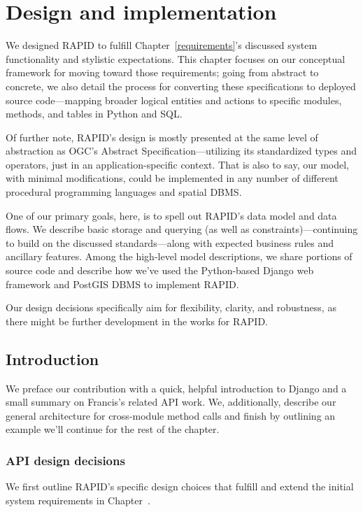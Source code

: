 \chapter{Design and implementation}
\label{design}

We designed RAPID to fulfill Chapter~\ref{requirements}'s discussed system functionality and stylistic expectations. This chapter focuses on our conceptual framework for moving toward those requirements; going from abstract to concrete, we also detail the process for converting these specifications to deployed source code---mapping broader logical entities and actions to specific modules, methods, and tables in Python and SQL.

Of further note, RAPID's design is mostly presented at the same level of abstraction as OGC's Abstract Specification---utilizing its standardized types and operators, just in an application-specific context. That is also to say, our model, with minimal modifications, could be implemented in any number of different procedural programming languages and spatial DBMS.

One of our primary goals, here, is to spell out RAPID's data model and data flows. We describe basic storage and querying (as well as constraints)---continuing to build on the discussed standards---along with expected business rules and ancillary features. Among the high-level model descriptions, we share portions of source code and describe how we've used the Python-based Django web framework and PostGIS DBMS to implement RAPID.

Our design decisions specifically aim for flexibility, clarity, and robustness, as there might be further development in the works for RAPID.


 

\section{Introduction}
We preface our contribution with a quick, helpful introduction to Django and a small summary on Francis's related API work. We, additionally, describe our general architecture for cross-module method calls and finish by outlining an example we'll continue for the rest of the chapter.

\subsection{API design decisions}
We first outline RAPID's specific design choices that fulfill and extend the initial system requirements in Chapter~\cite{Requirements}.

